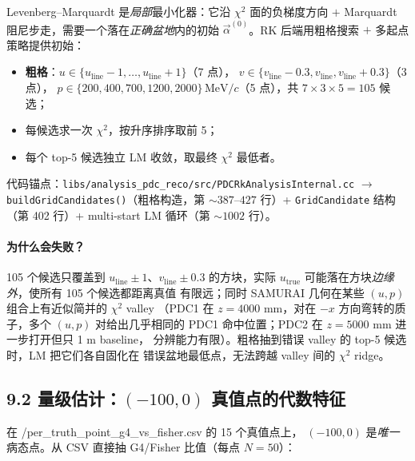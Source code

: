 Levenberg--Marquardt 是\emph{局部}最小化器：它沿 $\chi^2$ 面的负梯度方向 $+$ Marquardt
阻尼步走，需要一个落在\emph{正确盆地}内的初始 $\vec\alpha^{(0)}$。RK 后端用粗格搜索
$+$ 多起点策略提供初始：
\begin{itemize}
  \item \textbf{粗格}：$u\in\{u_\mathrm{line}-1,\ldots,u_\mathrm{line}+1\}$（7 点），
        $v\in\{v_\mathrm{line}-0.3, v_\mathrm{line}, v_\mathrm{line}+0.3\}$（3 点），
        $p\in\{200, 400, 700, 1200, 2000\}\,\mathrm{MeV}/c$（5 点），共
        $7\times 3\times 5 = 105$ 候选；
  \item 每候选求一次 $\chi^2$，按升序排序取前 5；
  \item 每个 top-5 候选独立 LM 收敛，取最终 $\chi^2$ 最低者。
\end{itemize}
代码锚点：\texttt{libs/analysis\_pdc\_reco/src/PDCRkAnalysisInternal.cc}
$\to$ \texttt{buildGridCandidates()}（粗格构造，第 $\sim 387$--$427$ 行）+
\texttt{GridCandidate} 结构（第 402 行）+ multi-start LM 循环（第 $\sim 1002$ 行）。

\paragraph{为什么会失败？} 105 个候选只覆盖到 $u_\mathrm{line}\pm 1$、$v_\mathrm{line}\pm 0.3$
的方块，实际 $u_\mathrm{true}$ 可能落在方块\emph{边缘外}，使所有 105 个候选都距离真值
有限远；同时 SAMURAI 几何在某些 $(u, p)$ 组合上有近似简并的 $\chi^2$ valley
（PDC1 在 $z=4000$ mm，对在 $-x$ 方向弯转的质子，多个 $(u, p)$ 对给出几乎相同的
PDC1 命中位置；PDC2 在 $z=5000$ mm 进一步打开但只 1 m baseline，
分辨能力有限）。粗格抽到错误 valley 的 top-5 候选时，LM 把它们各自固化在
错误盆地最低点，无法跨越 valley 间的 $\chi^2$ ridge。

\subsection*{9.2 量级估计：\texorpdfstring{$(-100, 0)$}{(-100,0)} 真值点的代数特征}

在 \DeepDiveData{}/per\_truth\_point\_g4\_vs\_fisher.csv 的 15 个真值点上，
$(-100, 0)$ 是\emph{唯一}病态点。从 CSV 直接抽 G4/Fisher 比值（每点 $N=50$）：

